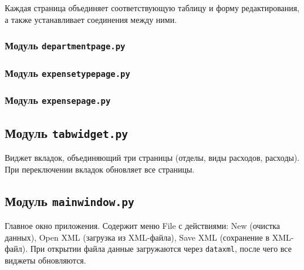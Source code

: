 \documentclass[14pt,a4paper]{extreport}
\begin{document}
Каждая страница объединяет соответствующую таблицу и форму редактирования, а также устанавливает соединения между ними.

\subsubsection{Модуль \texttt{departmentpage.py}}



\subsubsection{Модуль \texttt{expensetypepage.py}}



\subsubsection{Модуль \texttt{expensepage.py}}



\subsection{Модуль \texttt{tabwidget.py}}

Виджет вкладок, объединяющий три страницы (отделы, виды расходов, расходы). При переключении вкладок обновляет все страницы.



\subsection{Модуль \texttt{mainwindow.py}}

Главное окно приложения. Содержит меню File с действиями: New (очистка данных), Open XML (загрузка из XML-файла), Save XML (сохранение в XML-файл). При открытии файла данные загружаются через \texttt{dataxml}, после чего все виджеты обновляются.


\end{document}
